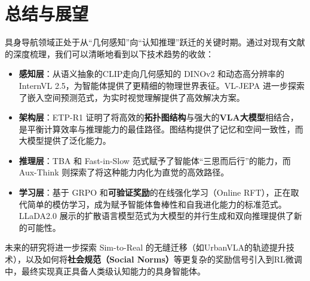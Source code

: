 \section{总结与展望}
具身导航领域正处于从“几何感知”向“认知推理”跃迁的关键时期。通过对现有文献的深度梳理，我们可以清晰地看到以下技术趋势的收敛：
\begin{itemize}
    \item \textbf{感知层}：从语义抽象的CLIP走向几何感知的 DINOv2 和动态高分辨率的 InternVL 2.5，为智能体提供了更精细的物理世界表征。VL-JEPA \cite{vl_jepa} 进一步探索了嵌入空间预测范式，为实时视觉理解提供了高效解决方案。
    \item \textbf{架构层}：ETP-R1 证明了将高效的\textbf{拓扑图结构}与强大的\textbf{VLA大模型}相结合，是平衡计算效率与推理能力的最佳路径。图结构提供了记忆和空间一致性，而大模型提供了泛化能力。
    \item \textbf{推理层}：TBA 和 Fast-in-Slow 范式赋予了智能体“三思而后行”的能力，而 Aux-Think 则探索了将这种能力内化为直觉的高效路径。
    \item \textbf{学习层}：基于 GRPO 和\textbf{可验证奖励}的在线强化学习（Online RFT），正在取代简单的模仿学习，成为赋予智能体鲁棒性和自我进化能力的标准范式。LLaDA2.0 \cite{llada2} 展示的扩散语言模型范式为大模型的并行生成和双向推理提供了新的可能性。
\end{itemize}

未来的研究将进一步探索 Sim-to-Real 的无缝迁移（如UrbanVLA的轨迹提升技术），以及如何将\textbf{社会规范（Social Norms）}等更复杂的奖励信号引入到RL微调中，最终实现真正具备人类级认知能力的具身智能体。

\begin{table}[htbp]
    \centering
    \caption{主流具身导航框架对比分析}
    \label{tab:comparison}
\end{table}

\begingroup
    \printbibliography[title={参考文献}]
\endgroup